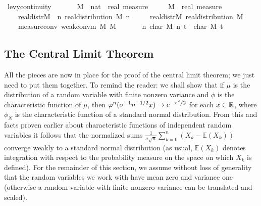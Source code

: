 \documentclass[leqno]{article}
\theoremstyle{definition}
\renewcommand{\E}{\mathbb E}
\begin{document}
\begin{isabellebody}
\isamarkupfalse%
\ levy{\isacharunderscore}continuity{}{\isacharcolon}\isanewline
\ \ \isanewline
\ \ \ \ M\ {\isacharcolon}{\isacharcolon}\ {\isachardoublequoteopen}nat\ {\isasymRightarrow}\ real\ measure{\isachardoublequoteclose}\ \isanewline
\ \ \ \ M{\isacharprime}\ {\isacharcolon}{\isacharcolon}\ {\isachardoublequoteopen}real\ measure{\isachardoublequoteclose}\isanewline
\ \ \ \isanewline
\ \ \ \ real{\isacharunderscore}distr{\isacharunderscore}M\ {\isacharcolon}\ {\isachardoublequoteopen}{\isasymAnd}n{\isachardot}\ real{\isacharunderscore}distribution\ {\isacharparenleft}M\ n{\isacharparenright}{\isachardoublequoteclose}\ \isanewline
\ \ \ \ real{\isacharunderscore}distr{\isacharunderscore}M{\isacharprime}{\isacharcolon}\ {\isachardoublequoteopen}real{\isacharunderscore}distribution\ M{\isacharprime}{\isachardoublequoteclose}\ \isanewline
\ \ \ \ measure{\isacharunderscore}conv{\isacharcolon}\ {\isachardoublequoteopen}weak{\isacharunderscore}conv{\isacharunderscore}m\ M\ M{\isacharprime}{\isachardoublequoteclose}\isanewline
\ \ \isanewline
\ \ \ \ {\isachardoublequoteopen}{\isacharparenleft}{\isasymlambda}n{\isachardot}\ char\ {\isacharparenleft}M\ n{\isacharparenright}\ t{\isacharparenright}\ {\isacharminus}{\isacharminus}{\isacharminus}{\isacharminus}{\isachargreater}\ char\ M{\isacharprime}\ t{\isachardoublequoteclose}
\end{isabellebody}

\subsection{The Central Limit Theorem}

All the pieces are now in place for the proof of the central limit theorem; we just need to put them together. To remind the reader: we shall show that if $\mu$ is the distribution of a random variable with finite nonzero variance and $\phi$ is the characteristic function of $\mu$, then $\varphi^n (\sigma^{-1} n^{-1/2} x) \rightarrow e^{-x^2/2}$ for each $x \in \mathbb{R}$, where $\phi_N$ is the characteristic function of a standard normal distribution. From this and facts proven earlier about characteristic functions of independent random variables it follows that the normalized sums $\frac{1}{\sigma \sqrt n} \sum_{k=0}^n (X_k - \E(X_k))$ converge weakly to a standard normal distribution (as usual, $\E(X_k)$ denotes integration with respect to the probability measure on the space on which $X_k$ is defined). For the remainder of this section, we assume without loss of generality that the random variables we work with have mean zero and variance one (otherwise a random variable with finite nonzero variance can be translated and scaled).
\end{document}
